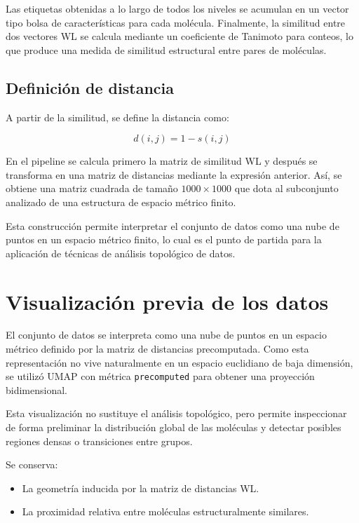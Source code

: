 \documentclass[12pt]{article}
\begin{document}
Las etiquetas obtenidas a lo largo de todos los niveles se acumulan en un vector tipo bolsa de caracter\'isticas para cada mol\'ecula. Finalmente, la similitud entre dos vectores WL se calcula mediante un coeficiente de Tanimoto para conteos, lo que produce una medida de similitud estructural entre pares de mol\'eculas.

\subsection{Definici\'on de distancia}

A partir de la similitud, se define la distancia como:

\[
d(i,j) = 1 - s(i,j)
\]

En el pipeline se calcula primero la matriz de similitud WL y despu\'es se transforma en una matriz de distancias mediante la expresi\'on anterior. As\'i, se obtiene una matriz cuadrada de tama\~no $1000 \times 1000$ que dota al subconjunto analizado de una estructura de espacio m\'etrico finito.

Esta construcción permite interpretar el conjunto de datos como una nube de puntos en un espacio métrico finito, lo cual es el punto de partida para la aplicación de técnicas de análisis topológico de datos.

\section{Visualizaci\'on previa de los datos}

El conjunto de datos se interpreta como una nube de puntos en un espacio m\'etrico definido por la matriz de distancias precomputada. Como esta representaci\'on no vive naturalmente en un espacio euclidiano de baja dimensi\'on, se utiliz\'o UMAP con m\'etrica \texttt{precomputed} para obtener una proyecci\'on bidimensional.

Esta visualizaci\'on no sustituye el an\'alisis topol\'ogico, pero permite inspeccionar de forma preliminar la distribuci\'on global de las mol\'eculas y detectar posibles regiones densas o transiciones entre grupos.

Se conserva:
\begin{itemize}
    \item La geometr\'ia inducida por la matriz de distancias WL.
    \item La proximidad relativa entre mol\'eculas estructuralmente similares.
\end{itemize}
\end{document}
